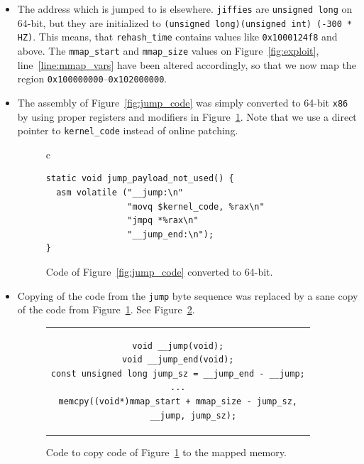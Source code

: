 \documentclass[10pt]{llncs}
\newcommand{\code}[2][]{\lstinline[columns=fullflexible, #1]$#2$}
\begin{document}
\begin{itemize}
\item The address which is jumped to is elsewhere. \code{jiffies} are
\code{unsigned long} on 64-bit, but they are initialized to \code{(unsigned
long)(unsigned int) (-300 * HZ)}.  This means, that \code{rehash_time}
contains values like \code{0x1000124f8} and above. The \code{mmap_start} and
\code{mmap_size} values on Figure~\ref{fig:exploit}, line~\ref{line:mmap_vars}
have been altered accordingly, so that we now map the region
\code{0x100000000}--\code{0x102000000}.

\item The assembly of Figure~\ref{fig:jump_code} was simply converted to
64-bit \texttt{x86} by using proper registers and modifiers in
Figure~\ref{fig:jump_code64}. Note that we use a direct pointer to
\code{kernel_code} instead of online patching.

\begin{figure}[htb]
  \begin{center}
    \begin{tabular}{c}
\begin{lstlisting}
static void jump_payload_not_used() {
  asm volatile ("__jump:\n"
                "movq $kernel_code, %rax\n"
                "jmpq *%rax\n"
                "__jump_end:\n");
}
\end{lstlisting} %
    \end{tabular}
  \end{center}
  \caption{Code of Figure~\ref{fig:jump_code} converted to 64-bit.}
  \label{fig:jump_code64}
\end{figure}

\item Copying of the code from the \code{jump} byte sequence was replaced by a
sane copy of the code from Figure~\ref{fig:jump_code64}. See
Figure~\ref{fig:copying}.

\begin{figure}[htb]
  \begin{center}
    \begin{tabular}{c}
\begin{lstlisting}
void __jump(void);
void __jump_end(void);
const unsigned long jump_sz = __jump_end - __jump;
...
memcpy((void*)mmap_start + mmap_size - jump_sz,
      __jump, jump_sz);
\end{lstlisting}
    \end{tabular}
  \end{center}
  \caption{Code to copy code of Figure~\ref{fig:jump_code64} to the mapped
  memory.}
  \label{fig:copying}
\end{figure}

\end{itemize}
\end{document}
